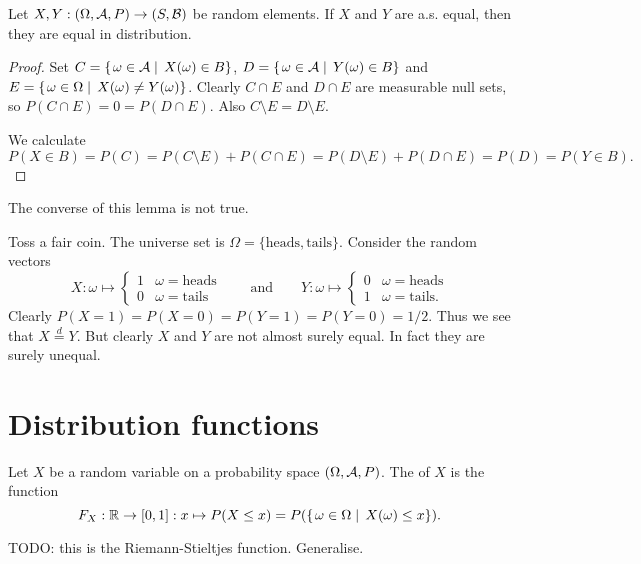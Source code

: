 \begin{lemma}
Let $X, Y: \left( \Omega, \mathcal{A}, P \right) \to \left( S, \mathcal{B} \right)$ be random elements. If $X$ and $Y$ are a.s. equal, then they are equal in distribution.
\end{lemma}
\begin{proof}
Set $C = \left\{\left. \omega\in \mathcal{A} \;\right|\; X(\omega)\in B \right\}$, $D = \left\{\left. \omega\in \mathcal{A} \;\right|\; Y(\omega)\in B \right\}$ and $E = \left\{\left. \omega\in \Omega \;\right|\; X(\omega)\neq Y(\omega) \right\}$. Clearly $C\cap E$ and $D\cap E$ are measurable null sets, so $P(C\cap E) = 0 = P(D\cap E)$. Also $C\setminus E = D\setminus E$.

We calculate
\[ P(X\in B) = P(C) = P(C\setminus E) +P(C\cap E) = P(D\setminus E) +P(D\cap E) = P(D) = P(Y\in B). \]
\end{proof}
The converse of this lemma is not true.
\begin{example}
Toss a fair coin. The universe set is $\Omega = \{\text{heads}, \text{tails}\}$. Consider the random vectors
\[ X: \omega \mapsto \begin{cases}
1 & \omega = \text{heads} \\ 0 & \omega = \text{tails}
\end{cases} \qquad\text{and}\qquad  Y: \omega \mapsto \begin{cases}
0 & \omega = \text{heads} \\ 1 & \omega = \text{tails}.
\end{cases} \]
Clearly $P(X = 1) = P(X = 0) = P(Y = 1) = P(Y = 0) = 1/2$. Thus we see that $X \overset{d}{=} Y$. But clearly $X$ and $Y$ are not almost surely equal. In fact they are surely unequal.
\end{example}

\section{Distribution functions}
\begin{definition}
Let $X$ be a random variable on a probability space $\left( \Omega, \mathcal{A}, P \right)$. The  of $X$ is the function
\[ F_X: \mathbb{R} \to [0,1]: x\mapsto P(X \leq x) = P(\left\{\left. \omega\in \Omega \;\right|\; X(\omega) \leq x \right\}). \]
\end{definition}

TODO: this is the Riemann-Stieltjes function. Generalise.


